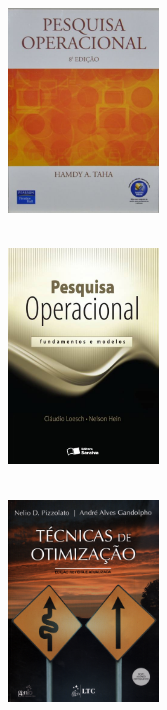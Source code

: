 \documentclass{beamer}
\begin{document}
\begin{frame}
{
	\begin{figure}[!htb]
		\includegraphics[width=4cm, height=6cm]{pesquisaoperacionalpearson.jpg}
	\end{figure}
}

{
	\begin{figure}[!htb]
		\includegraphics[width=4cm, height=6cm]{pesquisaoperacionalsaraiva.jpg}
	\end{figure}
}

{
	\begin{figure}[!htb]
		\includegraphics[width=4cm, height=6cm]{tecnicasdeotimizacao.png}
	\end{figure}
}


\end{frame}
\end{document}
